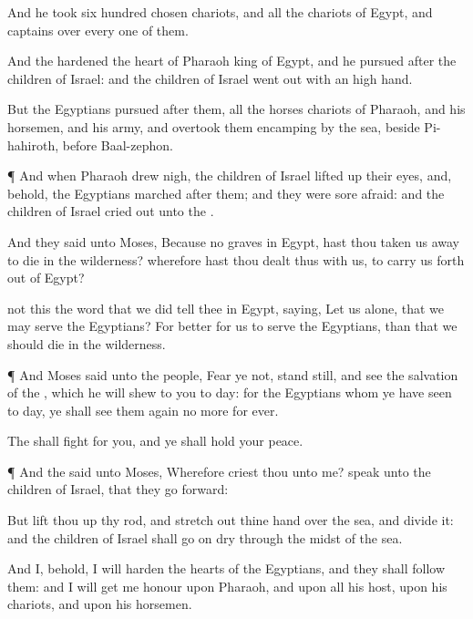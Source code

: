 {And he
took
six
hundred
chosen
chariots, and all the
chariots of
Egypt, and
captains over every one of them.

And the
{}
hardened the
heart of
Pharaoh
king of
Egypt, and he
pursued
after the
children of
Israel: and the
children of
Israel went
out with an
high
hand.

But the
Egyptians
pursued
after them, all the
horses
{}
chariots of
Pharaoh, and his
horsemen, and his
army, and
overtook them
encamping by the
sea, beside
Pi-hahiroth,
before
Baal-zephon.


\par }{\PP {}¶ And when
Pharaoh drew
nigh, the
children of
Israel lifted
up their
eyes, and, behold, the
Egyptians
marched
after them; and they were
sore
afraid: and the
children of
Israel cried
out unto the
{}.

And they
said unto
Moses, Because
{} no
graves in
Egypt, hast thou taken us
away to
die in the
wilderness?
wherefore hast thou
dealt thus with us, to carry us
forth out of
Egypt?

 not this the
word that we did
tell thee in
Egypt,
saying, Let us
alone, that we may
serve the
Egyptians? For
{}
better for us to
serve the
Egyptians, than that we should
die in the
wilderness.


\par }{\PP {}¶ And
Moses
said unto the
people,
Fear ye not, stand
still, and
see the
salvation of the
{}, which he will
shew to you to
day: for the
Egyptians whom ye have
seen to
day, ye shall
see them
again no more
for
ever.

The
{} shall
fight for you, and ye shall hold your
peace.


\par }{\PP {}¶ And the
{}
said unto
Moses, Wherefore
criest thou unto me?
speak unto the
children of
Israel, that they go
forward:

But lift thou
up thy
rod, and stretch
out thine
hand over the
sea, and
divide it: and the
children of
Israel shall
go on
dry
{} through the
midst of the
sea.

And I, behold, I will
harden the
hearts of the
Egyptians, and they shall
follow
them: and I will get me
honour upon
Pharaoh, and upon all his
host, upon his
chariots, and upon his
horsemen.

}
